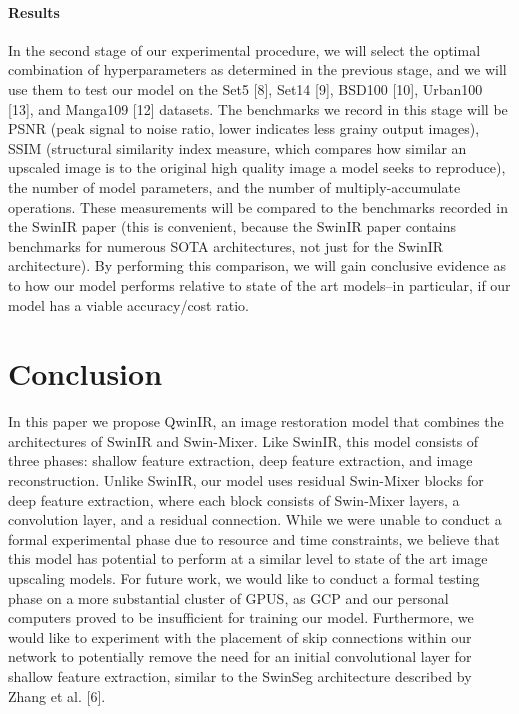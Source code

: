 \documentclass{article}
\begin{document}
\paragraph{Results} In the second stage of our experimental procedure, we will select the optimal combination of hyperparameters as determined in the previous stage, and we will use them to test our model on the Set5 [8], Set14 [9], BSD100 [10], Urban100 [13], and Manga109 [12] datasets. The benchmarks we record in this stage will be PSNR (peak signal to noise ratio, lower indicates less grainy output images), SSIM (structural similarity index measure, which compares how similar an upscaled image is to the original high quality image a model seeks to reproduce), the number of model parameters, and the number of multiply-accumulate operations. These measurements will be compared to the benchmarks recorded in the SwinIR paper (this is convenient, because the SwinIR paper contains benchmarks for numerous SOTA architectures, not just for the SwinIR architecture). By performing this comparison, we will gain conclusive evidence as to how our model performs relative to state of the art models–in particular, if our model has a viable accuracy/cost ratio.

\section{Conclusion}

In this paper we propose QwinIR, an image restoration model that combines the architectures of SwinIR and Swin-Mixer. Like SwinIR, this model consists of three phases: shallow feature extraction, deep feature extraction, and image reconstruction. Unlike SwinIR, our model uses residual Swin-Mixer blocks for deep feature extraction, where each block consists of Swin-Mixer layers, a convolution layer, and a residual connection. While we were unable to conduct a formal experimental phase due to resource and time constraints, we believe that this model has potential to perform at a similar level to state of the art image upscaling models. For future work, we would like to conduct a formal testing phase on a more substantial cluster of GPUS, as GCP and our personal computers proved to be insufficient for training our model. Furthermore, we would like to experiment with the placement of skip connections within our network to potentially remove the need for an initial convolutional layer for shallow feature extraction, similar to the SwinSeg architecture described by Zhang et al. [6].
\end{document}
